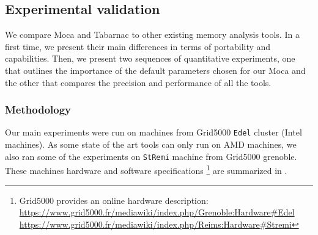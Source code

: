 \subsection{Experimental validation}
\label{sec:Tools-Comp}

We compare \gls{Moca} and \gls{Tabarnac} to other existing memory analysis tools.
In a first time, we present their main differences in terms of portability and capabilities.
Then, we present two sequences of quantitative experiments, one that outlines the importance of the default parameters chosen for our \gls{Moca} and the other that compares the precision and performance of all the tools.

\subsubsection{Methodology}

Our main experiments were run on  machines from \gls{Grid5000} \texttt{Edel}
cluster (Intel machines).
As some state of the art tools can only run on \gls{AMD} machines, we also ran
    some of the experiments on
    \texttt{StRemi} machine from \gls{Grid5000} grenoble.
    These machines hardware and software specifications%
    \footnote{\gls{Grid5000} provides an online hardware description:\\
       \url{https://www.grid5000.fr/mediawiki/index.php/Grenoble:Hardware\#Edel}
       \\\url{https://www.grid5000.fr/mediawiki/index.php/Reims:Hardware\#Stremi}}
    are summarized in .


